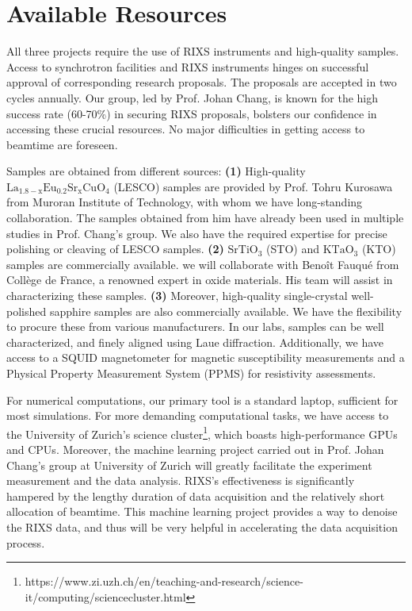 \documentclass[11pt]{article}
\begin{document}
\section{Available Resources}
All three projects require the use of RIXS instruments and high-quality samples. Access to synchrotron facilities and RIXS instruments hinges on successful approval of corresponding research proposals. The proposals are accepted in two cycles annually. Our group, led by Prof. Johan Chang, is known for the high success rate (60-70\%) in securing RIXS proposals, bolsters our confidence in accessing these crucial resources. No major difficulties in getting access to beamtime are foreseen. 

Samples are obtained from different sources: \textbf{(1)} High-quality $\mathrm{La_{1.8-x}Eu_{0.2}Sr_xCuO_{4}}$ (LESCO) samples are provided by Prof. Tohru Kurosawa from Muroran Institute of Technology, with whom we have long-standing collaboration. The samples obtained from him have already been used in multiple studies\cite{choi2022unveiling,wang_charge_2021} in Prof. Chang's group. We also have the required expertise for precise polishing or cleaving of LESCO samples. \textbf{(2)} $\mathrm{SrTiO_{3}}$ (STO) and $\mathrm{KTaO_{3}}$ (KTO) samples are commercially available. we will collaborate with Benoît Fauqué from Collège de France, a renowned expert in oxide materials. His team will assist in characterizing these samples. \textbf{(3)} Moreover, high-quality single-crystal well-polished sapphire samples are also commercially available. We have the flexibility to procure these from various manufacturers. In our labs, samples can be well characterized, and finely aligned using Laue diffraction. Additionally, we have access to a SQUID magnetometer for magnetic susceptibility measurements and a Physical Property Measurement System (PPMS) for resistivity assessments.

For numerical computations, our primary tool is a standard laptop, sufficient for most simulations. For more demanding computational tasks, we have access to the University of Zurich's science cluster\footnote{https://www.zi.uzh.ch/en/teaching-and-research/science-it/computing/sciencecluster.html}, which boasts high-performance GPUs and CPUs. Moreover, the machine learning project carried out in Prof. Johan Chang's group at University of Zurich will greatly facilitate the experiment measurement and the data analysis. RIXS's  effectiveness is significantly hampered by the lengthy duration of data acquisition and the relatively short allocation of beamtime. This machine learning project provides a way to denoise the RIXS data, and thus will be very helpful in accelerating the data acquisition process.  
\end{document}
